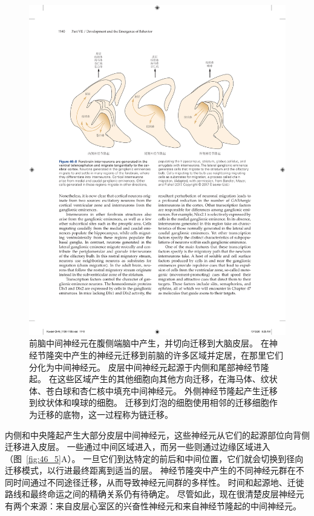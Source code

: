 \begin{figure}[htbp]
	\centering
	\includegraphics[width=1.0\linewidth]{chap46/fig_46_8}
	\caption{前脑中间神经元在腹侧端脑中产生，并切向迁移到大脑皮层。
		在神经节隆突中产生的神经元迁移到前脑的许多区域并定居，在那里它们分化为中间神经元。
		皮层中间神经元起源于内侧和尾部神经节隆起。
		在这些区域产生的其他细胞向其他方向迁移，在海马体、纹状体、苍白球和杏仁核中填充中间神经元。
		外侧神经节隆起产生迁移到纹状体和嗅球的细胞。
		迁移到灯泡的细胞使用相邻的迁移细胞作为迁移的底物，这一过程称为链迁移\cite{bandler2017cortical}。}
	\label{fig:46_8}
\end{figure}


内侧和中央隆起产生大部分皮层中间神经元，这些神经元从它们的起源部位向背侧迁移进入皮层。
一些通过中间区域进入，而另一些则通过边缘区域进入（图~\ref{fig:46_5}A）。
一旦它们到达特定的前后和中间位置，它们就会切换到径向迁移模式，以行进最终距离到适当的层。
神经节隆突中产生的不同神经元群在不同时间通过不同途径迁移，从而导致神经元间群的多样性。
时间和起源地、迁徙路线和最终命运之间的精确关系仍有待确定。
尽管如此，现在很清楚皮层神经元有两个来源：来自皮层心室区的兴奋性神经元和来自神经节隆起的中间神经元。


